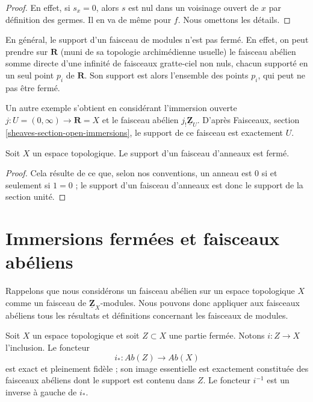 \begin{proof}
En effet, si $s_x = 0$, alors $s$ est nul dans un voisinage ouvert de $x$ par
définition des germes. Il en va de même pour $f$. Nous omettons les détails.
\end{proof}

\noindent
En général, le support d'un faisceau de modules n'est pas fermé. En effet, on
peut prendre sur $\mathbf{R}$ (muni de sa topologie archimédienne usuelle) le
faisceau abélien somme directe d'une infinité de faisceaux gratte-ciel non nuls,
chacun supporté en un seul point $p_i$ de $\mathbf{R}$. Son support est alors
l'ensemble des points $p_i$, qui peut ne pas être fermé.

\medskip\noindent
Un autre exemple s'obtient en considérant l'immersion ouverte
$j : U = (0 , \infty) \to \mathbf{R} = X$ et le faisceau abélien
$j_!\underline{\mathbf{Z}}_U$. D'après Faisceaux, section
\ref{sheaves-section-open-immersions}, le support de ce faisceau est exactement
$U$.

\begin{lemma}
\label{lemma-support-sheaf-rings-closed}
Soit $X$ un espace topologique. Le support d'un faisceau d'anneaux est fermé.
\end{lemma}

\begin{proof}
Cela résulte de ce que, selon nos conventions, un anneau est $0$ si et seulement
si $1 = 0$ ; le support d'un faisceau d'anneaux est donc le support de la
section unité.
\end{proof}






\section{Immersions fermées et faisceaux abéliens}
\label{section-closed-immersions}

\noindent
Rappelons que nous considérons un faisceau abélien sur un espace topologique
$X$ comme un faisceau de $\underline{\mathbf{Z}}_X$-modules. Nous pouvons donc
appliquer aux faisceaux abéliens tous les résultats et définitions concernant
les faisceaux de modules.

\begin{lemma}
\label{lemma-i-star-exact}
Soit $X$ un espace topologique et soit $Z \subset X$ une partie fermée.
Notons $i : Z \to X$ l'inclusion. Le foncteur
$$
i_* : \textit{Ab}(Z) \longrightarrow \textit{Ab}(X)
$$
est exact et pleinement fidèle ; son image essentielle est exactement
constituée des faisceaux abéliens dont le support est contenu dans $Z$. Le
foncteur $i^{-1}$ est un inverse à gauche de $i_*$.
\end{lemma}

